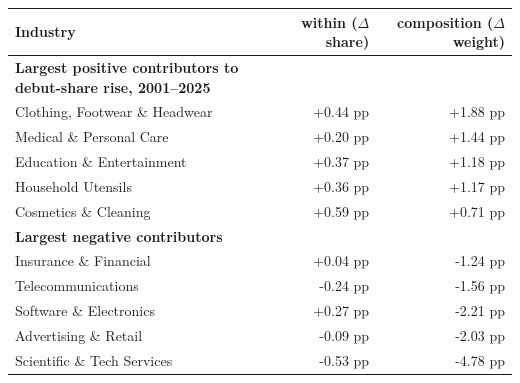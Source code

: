 \begin{tabular}{lrr}
\toprule
Industry & within ($\Delta$ share) & composition ($\Delta$ weight) \\
\midrule
\textbf{Largest positive contributors to debut-share rise, 2001--2025} & & \\
  Clothing, Footwear \& Headwear & +0.44 pp & +1.88 pp \\
  Medical \& Personal Care & +0.20 pp & +1.44 pp \\
  Education \& Entertainment & +0.37 pp & +1.18 pp \\
  Household Utensils & +0.36 pp & +1.17 pp \\
  Cosmetics \& Cleaning & +0.59 pp & +0.71 pp \\
\midrule
\textbf{Largest negative contributors} & & \\
  Insurance \& Financial & +0.04 pp & -1.24 pp \\
  Telecommunications & -0.24 pp & -1.56 pp \\
  Software \& Electronics & +0.27 pp & -2.21 pp \\
  Advertising \& Retail & -0.09 pp & -2.03 pp \\
  Scientific \& Tech Services & -0.53 pp & -4.78 pp \\
\bottomrule
\end{tabular}
